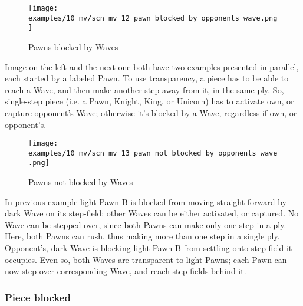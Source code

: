 \vspace*{-0.7\baselineskip}
\noindent
\begin{wrapfigure}[13]{l}{0.4\textwidth}
\centering
\texttt{[image: examples/10\_mv/scn\_mv\_12\_pawn\_blocked\_by\_opponents\_wave.png]}
\vspace*{-1.4\baselineskip}
\caption{Pawns blocked by Waves}
\label{fig:scn_mv_12_pawn_blocked_by_opponents_wave}
\end{wrapfigure}
Image on the left and the next one both have two examples presented in parallel,
each started by a labeled Pawn. \newline
\indent
To use transparency, a piece has to be able to reach a Wave, and then make another
step away from it, in the same ply. So, single-step piece (i.e. a Pawn, Knight, King,
or Unicorn) has to activate own, or capture opponent's Wave; otherwise it's blocked
by a Wave, regardless if own, or opponent's.

\vspace*{1.1\baselineskip}
\noindent
\begin{wrapfigure}[16]{l}{0.4\textwidth}
\centering
\texttt{[image: examples/10\_mv/scn\_mv\_13\_pawn\_not\_blocked\_by\_opponents\_wave.png]}
\vspace*{-1.4\baselineskip}
\caption{Pawns not blocked by Waves}
\label{fig:scn_mv_13_pawn_not_blocked_by_opponents_wave}
\end{wrapfigure}
In previous example light Pawn B is blocked from moving straight forward by dark
Wave on its step-field; other Waves can be either activated, or captured. No Wave
can be stepped over, since both Pawns can make only one step in a ply. \newline
\indent
Here, both Pawns can rush, thus making more than one step in a single ply. Opponent's,
dark Wave is blocking light Pawn B from settling onto step-field it occupies. Even so,
both Waves are transparent to light Pawns; each Pawn can now step over corresponding
Wave, and reach step-fields behind it.

\clearpage %

\subsubsection*{Piece blocked}
\label{sec:Miranda's veil/Wave/Activation/Piece blocked}

